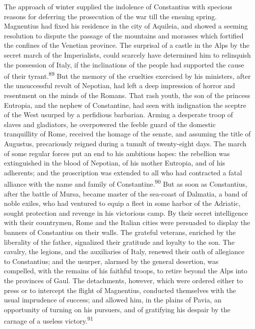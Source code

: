 The approach of winter supplied the indolence of Constantius with
specious reasons for deferring the prosecution of the war till
the ensuing spring. Magnentius had fixed his residence in the
city of Aquileia, and showed a seeming resolution to dispute the
passage of the mountains and morasses which fortified the
confines of the Venetian province. The surprisal of a castle in
the Alps by the secret march of the Imperialists, could scarcely
have determined him to relinquish the possession of Italy, if the
inclinations of the people had supported the cause of their
tyrant.\textsuperscript{89} But the memory of the cruelties exercised by his
ministers, after the unsuccessful revolt of Nepotian, had left a
deep impression of horror and resentment on the minds of the
Romans. That rash youth, the son of the princess Eutropia, and
the nephew of Constantine, had seen with indignation the sceptre
of the West usurped by a perfidious barbarian. Arming a desperate
troop of slaves and gladiators, he overpowered the feeble guard
of the domestic tranquillity of Rome, received the homage of the
senate, and assuming the title of Augustus, precariously reigned
during a tumult of twenty-eight days. The march of some regular
forces put an end to his ambitious hopes: the rebellion was
extinguished in the blood of Nepotian, of his mother Eutropia,
and of his adherents; and the proscription was extended to all
who had contracted a fatal alliance with the name and family of
Constantine.\textsuperscript{90} But as soon as Constantius, after the battle of
Mursa, became master of the sea-coast of Dalmatia, a band of
noble exiles, who had ventured to equip a fleet in some harbor of
the Adriatic, sought protection and revenge in his victorious
camp. By their secret intelligence with their countrymen, Rome
and the Italian cities were persuaded to display the banners of
Constantius on their walls. The grateful veterans, enriched by
the liberality of the father, signalized their gratitude and
loyalty to the son. The cavalry, the legions, and the auxiliaries
of Italy, renewed their oath of allegiance to Constantius; and
the usurper, alarmed by the general desertion, was compelled,
with the remains of his faithful troops, to retire beyond the
Alps into the provinces of Gaul. The detachments, however, which
were ordered either to press or to intercept the flight of
Magnentius, conducted themselves with the usual imprudence of
success; and allowed him, in the plains of Pavia, an opportunity
of turning on his pursuers, and of gratifying his despair by the
carnage of a useless victory.\textsuperscript{91}


